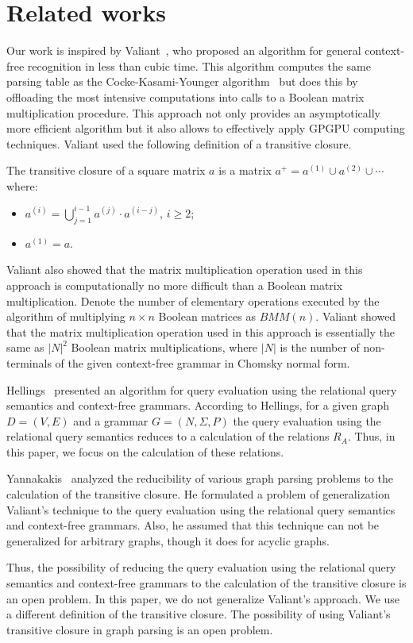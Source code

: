 \section{Related works} \label{section_related}
Our work is inspired by Valiant~\cite{valiant}, who proposed an algorithm for general context-free recognition in less than cubic time. This algorithm computes the same parsing table as the Cocke-Kasami-Younger algorithm~\cite{kasami, younger} but does this by offloading the most intensive computations into calls to a Boolean matrix multiplication procedure. This approach not only provides an asymptotically more efficient algorithm but it also allows to effectively apply GPGPU computing techniques. Valiant used the following definition of a transitive closure.

\begin{mydef}
The transitive closure of a square matrix $a$ is a matrix $a^+ = a^{(1)} \cup a^{(2)} \cup \cdots$ where:
\begin{itemize}
    \item $a^{(i)} = \bigcup^{i-1}_{j=1}{a^{(j)} \cdot a^{(i - j)}}$, $i \ge 2$;
    \item $a^{(1)} = a$.
\end{itemize}
\end{mydef}

Valiant also showed that the matrix multiplication operation used in this approach is computationally no more difficult than a Boolean matrix multiplication. Denote the number of elementary operations executed by the algorithm of multiplying $n \times n$ Boolean matrices as $BMM(n)$. Valiant showed that the matrix multiplication operation used in this approach is essentially the same as $|N|^2$ Boolean matrix multiplications, where $|N|$ is the number of non-terminals of the given context-free grammar in Chomsky normal form.

Hellings~\cite{hellingsRelational} presented an algorithm for query evaluation using the relational query semantics and context-free grammars. According to Hellings, for a given graph $D = (V, E)$ and a grammar $G = (N, \Sigma, P)$ the query evaluation using the relational query semantics reduces to a calculation of the relations $R_A$. Thus, in this paper, we focus on the calculation of these relations.

Yannakakis~\cite{transitive-closure} analyzed the reducibility of various graph parsing problems to the calculation of the transitive closure. He formulated a problem of generalization Valiant's technique to the query evaluation using the relational query semantics and context-free grammars. Also, he assumed that this technique can not be generalized for arbitrary graphs, though it does for acyclic graphs.

Thus, the possibility of reducing the query evaluation using the relational query semantics and context-free grammars to the calculation of the transitive closure is an open problem. In this paper, we do not generalize Valiant's approach. We use a different definition of the transitive closure. The possibility of using Valiant's transitive closure in graph parsing is an open problem.